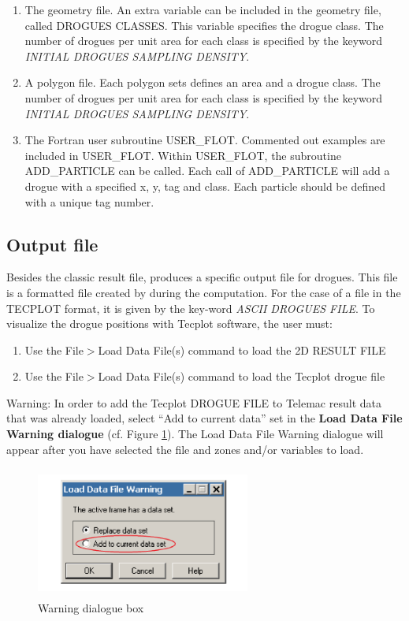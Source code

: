 \begin{enumerate}
\item  The geometry file.  An extra variable can be included in the geometry file, called DROGUES CLASSES.  This variable specifies the drogue class.  The number of drogues per unit area for each class is specified by the keyword \textit{INITIAL DROGUES SAMPLING DENSITY}.

\item  A polygon file.  Each polygon sets defines an area and a drogue class.  The number of drogues per unit area for each class is specified by the keyword \textit{INITIAL DROGUES SAMPLING DENSITY}.

\item  The Fortran user subroutine USER\_FLOT.  Commented out examples are included in USER\_FLOT.  Within USER\_FLOT, the subroutine ADD\_PARTICLE can be called.  Each call of ADD\_PARTICLE will add a drogue with a specified x, y, tag and class.  Each particle should be defined with a unique tag number.
\end{enumerate}

\subsection{ Output file}
\label{subs:drog:output:file}
 Besides the classic result file,  produces a specific output file for drogues.  This file is a formatted file created by  during the computation.  For the case of a file in the TECPLOT format, it is given by the key-word \textit{ASCII DROGUES FILE}.  To visualize the drogue positions with Tecplot software, the user must:

\begin{enumerate}
\item  Use the File$>$Load Data File(s) command to load the 2D RESULT FILE

\item  Use the File$>$Load Data File(s) command to load the Tecplot drogue file
\end{enumerate}

\begin{WarningBlock}{Warning:}
 In order to add the Tecplot DROGUE FILE to Telemac result data that was already loaded, select ``Add to current data'' set in the \textbf{Load Data File Warning dialogue} (cf. Figure \ref{fig:load:df}). The Load Data File Warning dialogue will appear after you have selected the file and zones and/or variables to load.
\end{WarningBlock}
\begin{figure}
\centering
 \includegraphics[width=2.77in, height=1.70in, keepaspectratio=false]{./graphics/warning1.png}
 \caption{Warning dialogue box}%
 \label{fig:load:df}
\end{figure}

